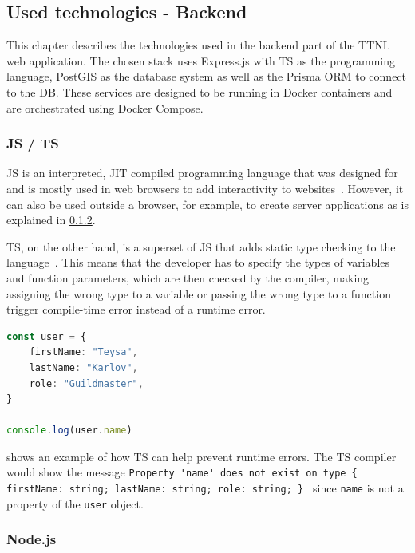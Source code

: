 
\subsection{Used technologies - Backend}

This chapter describes the technologies used in the backend part of the \ac{TTNL} web application.
The chosen stack uses Express.js with \ac{TS} as the programming language, PostGIS as the database system as well as the Prisma \ac{ORM} to connect to the \ac{DB}.
These services are designed to be running in Docker containers and are orchestrated using Docker Compose.

\subsubsection{\acf{JS} / \acf{TS}}

\ac{JS} is an interpreted, \ac{JIT} compiled programming language that was designed for and is mostly used in web browsers to add interactivity to websites~\cite{mdn_javascript_2023}.
However, it can also be used outside a browser, for example, to create server applications as is explained in \cref{sec:nodejs}.

\ac{TS}, on the other hand, is a superset of \ac{JS} that adds static type checking to the language~\cite{microsoft_javascript_nodate}.
This means that the developer has to specify the types of variables and function parameters, which are then checked by the compiler, making assigning the wrong type to a variable or passing the wrong type to a function trigger compile-time error instead of a runtime error.

\begin{lstlisting}[language=TypeScript, float, caption={Example of type checking in \ac{TS}}, label={lst:example-ts-type-checking}]
const user = {
    firstName: "Teysa",
    lastName: "Karlov",
    role: "Guildmaster",
}
    
console.log(user.name)
\end{lstlisting}

 shows an example of how \ac{TS} can help prevent runtime errors.
The \ac{TS} compiler would show the message \lstinline|Property 'name' does not exist on type { firstName: string; lastName: string; role: string; } | since \lstinline{name} is not a property of the \lstinline{user} object.

\subsubsection{Node.js}\label{sec:nodejs}


